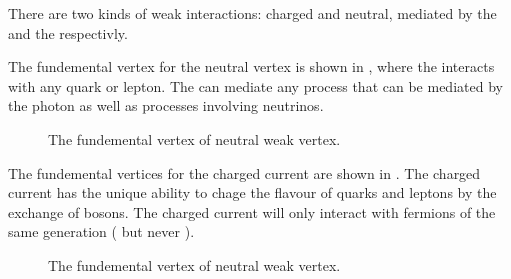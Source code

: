 There are two kinds of weak interactions: charged and neutral, mediated by the
\PW and the \PZ respectivly.

The fundemental vertex for the neutral vertex is shown in
, where the \PZ interacts with any quark or lepton.
The \pZ can mediate any process that can be mediated by the photon as well as
processes involving neutrinos.
\begin{figure}[htbp]
  \centering
  \caption{The fundemental vertex of neutral weak vertex.}
  \label{fig:neutral}
\end{figure}

The fundemental vertices for the charged current are shown in
. The charged current has the unique ability to chage the
flavour of quarks and leptons by the exchange of \PW bosons. The charged current
will only interact with fermions of the same generation
(\HepProcess{\Pelectron\to\Pnue} but never
\HepProcess{\Pelectron\to\Pnum}).
\begin{figure}[htbp]
  \centering
  \caption{The fundemental vertex of neutral weak vertex.}
  \label{fig:charged}
\end{figure}


